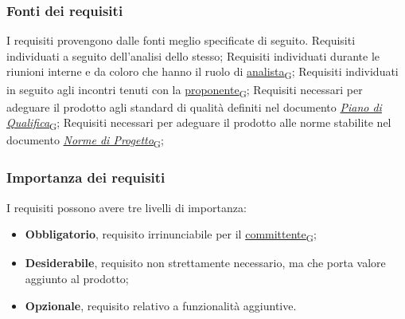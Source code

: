 \newpage

\subsubsection{Fonti dei requisiti}
\label{sec:fonti_requisiti}
I requisiti provengono dalle fonti meglio specificate di seguito.
Requisiti individuati a seguito dell'analisi dello stesso;
Requisiti individuati durante le riunioni interne e da coloro che hanno il ruolo di \href{https://7last.github.io/docs/rtb/documentazione-interna/glossario\#analista}{analista\textsubscript{G}};
Requisiti individuati in seguito agli incontri tenuti con la \href{https://7last.github.io/docs/rtb/documentazione-interna/glossario\#proponente}{proponente\textsubscript{G}};
Requisiti necessari per adeguare il prodotto agli standard di qualità definiti nel documento \href{https://7last.github.io/docs/rtb/documentazione-interna/glossario\#piano-di-qualifica}{\textit{Piano di Qualifica}\textsubscript{G}};
Requisiti necessari per adeguare il prodotto alle norme stabilite nel documento
\href{https://7last.github.io/docs/rtb/documentazione-interna/glossario\#norme-di-progetto}{\textit{Norme di Progetto}\textsubscript{G}};


\subsubsection{Importanza dei requisiti}
\label{sec:importanza_requisiti}
I requisiti possono avere tre livelli di importanza:
\begin{itemize}
	\item \textbf{Obbligatorio}, requisito irrinunciabile per il \href{https://7last.github.io/docs/rtb/documentazione-interna/glossario\#committente}{committente\textsubscript{G}};
	\item \textbf{Desiderabile}, requisito non strettamente necessario, ma che porta valore aggiunto al prodotto;
	\item \textbf{Opzionale}, requisito relativo a funzionalità aggiuntive.
\end{itemize}

